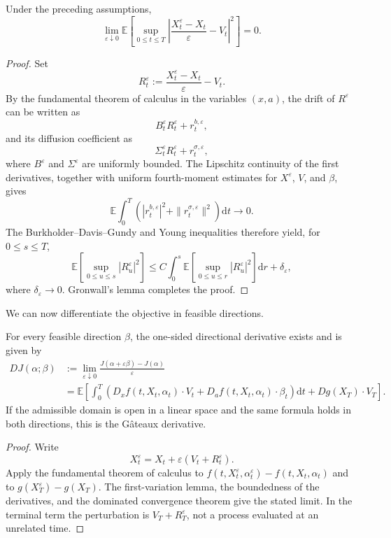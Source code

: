 \begin{lem}
Under the preceding assumptions,
\[
\lim_{\varepsilon\downarrow0}
\mathbb E\!\left[
\sup_{0\le t\le T}
\left|
\frac{X_t^\varepsilon-X_t}{\varepsilon}-V_t
\right|^2
\right]=0.
\]
\end{lem}

\begin{proof}
Set
\[
R_t^\varepsilon
:=\frac{X_t^\varepsilon-X_t}{\varepsilon}-V_t.
\]
By the fundamental theorem of calculus in the variables \((x,a)\), the drift of \(R^\varepsilon\) can be written as
\[
B_t^\varepsilon R_t^\varepsilon+r_t^{b,\varepsilon},
\]
and its diffusion coefficient as
\[
\Sigma_t^\varepsilon R_t^\varepsilon+r_t^{\sigma,\varepsilon},
\]
where \(B^\varepsilon\) and \(\Sigma^\varepsilon\) are uniformly bounded. The Lipschitz continuity of the first derivatives, together with uniform fourth-moment estimates for \(X^\varepsilon\), \(V\), and \(\beta\), gives
\[
\mathbb E\int_0^T
\left(
|r_t^{b,\varepsilon}|^2
+\|r_t^{\sigma,\varepsilon}\|^2
\right)\mathrm dt
\longrightarrow0.
\]
The Burkholder--Davis--Gundy and Young inequalities therefore yield, for \(0\le s\le T\),
\[
\mathbb E\!\left[
\sup_{0\le u\le s}|R_u^\varepsilon|^2
\right]
\le
C\int_0^s
\mathbb E\!\left[
\sup_{0\le u\le r}|R_u^\varepsilon|^2
\right]\mathrm dr
+\delta_\varepsilon,
\]
where \(\delta_\varepsilon\to0\). Gronwall's lemma completes the proof.
\end{proof}

We can now differentiate the objective in feasible directions.

\begin{prop}
For every feasible direction \(\beta\), the one-sided directional derivative exists and is given by
\[
\begin{aligned}
D J(\alpha;\beta)
&:=\lim_{\varepsilon\downarrow0}
\frac{J(\alpha+\varepsilon\beta)-J(\alpha)}{\varepsilon}\\
&=\mathbb E\!\left[
\int_0^T
\left(
D_xf(t,X_t,\alpha_t)\cdot V_t
+D_af(t,X_t,\alpha_t)\cdot\beta_t
\right)\mathrm dt
+Dg(X_T)\cdot V_T
\right].
\end{aligned}
\]
If the admissible domain is open in a linear space and the same formula holds in both directions, this is the G\^ateaux derivative.
\end{prop}

\begin{proof}
Write
\[
X_t^\varepsilon
=X_t+\varepsilon(V_t+R_t^\varepsilon).
\]
Apply the fundamental theorem of calculus to \(f(t,X_t^\varepsilon,\alpha_t^\varepsilon)-f(t,X_t,\alpha_t)\) and to \(g(X_T^\varepsilon)-g(X_T)\). The first-variation lemma, the boundedness of the derivatives, and the dominated convergence theorem give the stated limit. In the terminal term the perturbation is \(V_T+R_T^\varepsilon\), not a process evaluated at an unrelated time.
\end{proof}

